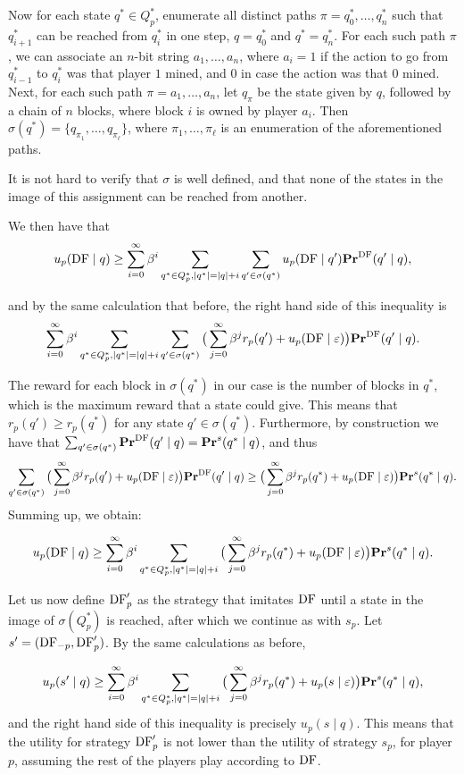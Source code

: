 Now for each state $q^* \in Q^*_p$, enumerate all distinct paths $\pi = q^*_0,\dots,q_n^*$ such that $q_{i+1}^*$ can be reached from 
$q_i^*$ in one step, $q = q_0^*$ and $q^* = q_n^*$. For each such path $\pi$, we can associate an $n$-bit string $a_1,\dots,a_n$, 
where $a_i = 1$ if the action to go from $q_{i-1}^*$ to $q_i^*$ was that player $1$ mined, and $0$ in case the action was that $0$ mined. 
Next, for each such path $\pi = a_1,\dots,a_n$, let $q_\pi$ be the state given by $q$, followed by a chain of $n$ blocks, where block $i$ is 
owned by player $a_i$. Then $\sigma(q^*) = \{q_{\pi_1},\dots,q_{\pi_\ell}\}$, where $\pi_1,\dots,\pi_\ell$ is an enumeration of the aforementioned paths. 

It is not hard to verify that $\sigma$ is well defined, and that none of 
the states in the image of this assignment can be reached from another. 

We then have that 
$$u_p( \text{\rm DF} \mid q) \geq \sum_{i=0}^\infty \beta^i \sum_{q^* \in Q^*_p, |q^*| = |q| + i} \sum_{q' \in \sigma(q^*)} 
u_p(\text{\rm DF} \mid q')  \mathbf{Pr}^{\text{\rm DF}}(q' \mid q), $$

and by the same calculation that before, the right hand side of this inequality is 
$$\sum_{i=0}^\infty \beta^i \sum_{q^* \in Q^*_p, |q^*| = |q| + i} \sum_{q' \in \sigma(q^*)}  \big(\sum_{j = 0}^\infty \beta^j r_p(q') + u_p(\text{\rm DF} \mid \varepsilon)\big) \mathbf{Pr}^{\text{\rm DF}}(q' \mid q).$$

The reward for each block in $\sigma(q^*)$ in our case is the number of blocks in $q^*$, which is the maximum reward that a state could give. This means that $r_p(q') \geq r_p(q^*)$ for any state $q' \in \sigma(q^*)$. 
Furthermore,  by construction we have that 
$\sum_{q' \in \sigma(q^*)} \mathbf{Pr}^{\text{\rm DF}}(q' \mid q) = \mathbf{Pr}^s(q^* \mid q)$, and thus 
$$\sum_{q' \in \sigma(q^*)} \big(\sum_{j = 0}^\infty \beta^j r_p(q') + u_p(\text{\rm DF} \mid \varepsilon)\big) \mathbf{Pr}^{\text{\rm DF}}(q' \mid q) \geq \big(\sum_{j = 0}^\infty \beta^j r_p(q^*) + u_p(\text{\rm DF} \mid \varepsilon)\big) \mathbf{Pr}^s(q^* \mid q).$$ 
Summing up, we obtain: 

$$u_p( \text{\rm DF} \mid q) \geq \sum_{i=0}^\infty \beta^i \sum_{q^* \in Q^*_p, |q^*| = |q| + i} \big(\sum_{j = 0}^\infty \beta^j r_p(q^*) + u_p(\text{\rm DF} \mid \varepsilon)\big)  \mathbf{Pr}^s(q^* \mid q).$$

Let us now define $\text{\rm DF}'_p$ as the strategy that imitates $\text{\rm DF}$ until a state in the image of $\sigma(Q^*_p)$ is reached, after which 
we continue as with $s_p$. Let $s' = (\text{\rm DF}_{-p},\text{\rm DF}'_p)$. By the same calculations as before, 

$$u_p(s' \mid q) \geq \sum_{i=0}^\infty \beta^i \sum_{q^* \in Q^*_p, |q^*| = |q| + i} \big(\sum_{j = 0}^\infty \beta^j r_p(q^*) + u_p(s \mid \varepsilon)\big)  \mathbf{Pr}^s(q^* \mid q), $$
and the right hand side of this inequality is precisely $u_p(s \mid q)$. This means that the utility for strategy $\text{\rm DF}'_p$ is not lower than the utility of strategy $s_p$, for player $p$, assuming the rest of the players play according to $\text{\rm DF}$. 

